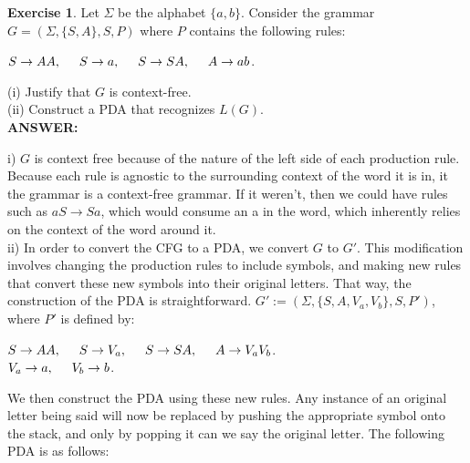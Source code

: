 \documentclass{article}
\begin{document}
\textbf{Exercise 1}. Let $\Sigma$ be the alphabet $\{a, b\}$. Consider the grammar $G =
(\Sigma, \{S, A\}, S, P)$ where $P$ contains the following rules:\\
\begin{center}
$S \rightarrow AA, \hspace{0.5cm} S \rightarrow a, \hspace{0.5cm} S \rightarrow SA, \hspace{0.5cm} A \rightarrow ab$.\\
\end{center}
(i) Justify that $G$ is context-free.\\
(ii) Construct a PDA that recognizes $L(G)$. \\

\textbf{ANSWER:}

i) $G$ is context free because of the nature of the left side of each production rule. Because each rule is agnostic to the surrounding context of the word it is in, it the grammar is a context-free grammar. If it weren't, then we could have rules such as $aS \rightarrow Sa$, which would consume an a in the word, which inherently relies on the context of the word around it. \\

ii) In order to convert the CFG to a PDA, we convert $G$ to $G'$. This modification involves changing the production rules to include symbols, and making new rules that convert these new symbols into their original letters. That way, the construction of the PDA is straightforward. 
$G' := (\Sigma, \{S, A, V_a, V_b\}, S, P')$, where $P'$ is defined by:
\begin{center}
	$S \rightarrow AA, \hspace{0.5cm} S \rightarrow V_a, \hspace{0.5cm} S \rightarrow SA, \hspace{0.5cm} A \rightarrow V_aV_b$.\\
	$V_a \rightarrow a, \hspace{0.5cm} V_b \rightarrow b$. \\
\end{center}

We then construct the PDA using these new rules. Any instance of an original letter being said will now be replaced by pushing the appropriate symbol onto the stack, and only by popping it can we say the original letter. The following PDA is as follows:
\end{document}
